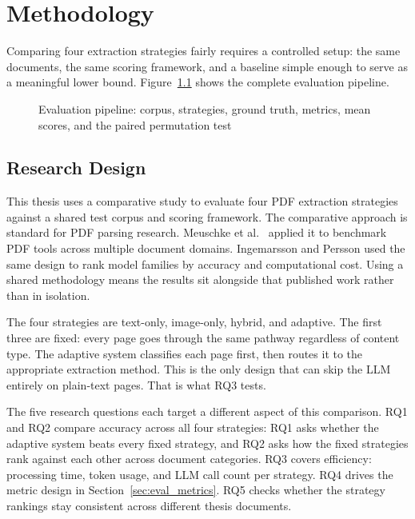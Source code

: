 \chapter{Methodology}

Comparing four extraction strategies fairly requires a controlled setup: the
same documents, the same scoring framework, and a baseline simple enough to
serve as a meaningful lower bound. Figure~\ref{fig:eval_pipeline} shows the
complete evaluation pipeline.

\begin{figure}[ht]
    \centering
    
    \caption{Evaluation pipeline: corpus, strategies, ground truth, metrics, mean scores, and the paired permutation test}
    \label{fig:eval_pipeline}
\end{figure}

\section{Research Design}

This thesis uses a comparative study to evaluate four PDF extraction strategies
against a shared test corpus and scoring framework. The comparative approach is
standard for PDF parsing research. Meuschke et al.\ \autocite{meuschke2023}
applied it to benchmark PDF tools across multiple document domains. Ingemarsson
and Persson \autocite{ingemarsson2024} used the same design to rank model families
by accuracy and computational cost. Using a shared methodology means the results
sit alongside that published work rather than in isolation.

The four strategies are text-only, image-only, hybrid, and adaptive. The first
three are fixed: every page goes through the same pathway regardless of content
type. The adaptive system classifies each page first, then routes it to the
appropriate extraction method. This is the only design that can skip the LLM
entirely on plain-text pages. That is what RQ3 tests.

The five research questions each target a different aspect of this comparison.
RQ1 and RQ2 compare accuracy across all four strategies: RQ1 asks whether the
adaptive system beats every fixed strategy, and RQ2 asks how the fixed
strategies rank against each other across document categories. RQ3 covers
efficiency: processing time, token usage, and LLM call count per strategy. RQ4
drives the metric design in Section~\ref{sec:eval_metrics}. RQ5 checks whether the strategy
rankings stay consistent across different thesis documents.

